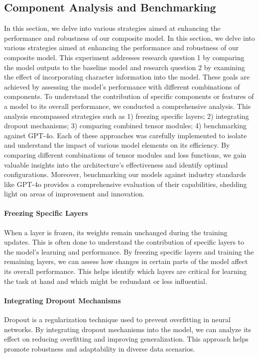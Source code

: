 \subsection{Component Analysis and Benchmarking}
\label{subsec:4_component_analysis_and_benchmarking}
In this section, we delve into various strategies aimed at enhancing the performance and robustness of our composite model. In this section, we delve into various strategies aimed at enhancing the performance and robustness of our composite model. This experiment addresses research question 1 by comparing the model outputs to the baseline model and research question 2 by examining the effect of incorporating character information into the model. These goals are achieved by assessing the model's performance with different combinations of components. To understand the contribution of specific components or features of a model to its overall performance, we conducted a comprehensive analysis. This analysis encompassed strategies such as 1) freezing specific layers; 2) integrating dropout mechanisms; 3) comparing combined tensor modules; 4) benchmarking against GPT-4o. Each of these approaches was carefully implemented to isolate and understand the impact of various model elements on its efficiency. By comparing different combinations of tensor modules and loss functions, we gain valuable insights into the architecture's effectiveness and identify optimal configurations. Moreover, benchmarking our models against industry standards like GPT-4o provides a comprehensive evaluation of their capabilities, shedding light on areas of improvement and innovation.

\paragraph*{Freezing Specific Layers}
\label{par:4_freezing_specific_layers}
When a layer is frozen, its weights remain unchanged during the training updates. This is often done to understand the contribution of specific layers to the model's learning and performance. By freezing specific layers and training the remaining layers, we can assess how changes in certain parts of the model affect its overall performance. This helps identify which layers are critical for learning the task at hand and which might be redundant or less influential.

\paragraph*{Integrating Dropout Mechanisms}
\label{par:4_integrating_dropout_mechanisms} 
Dropout is a regularization technique used to prevent overfitting in neural networks. By integrating dropout mechanisms into the model, we can analyze its effect on reducing overfitting and improving generalization. This approach helps promote robustness and adaptability in diverse data scenarios.

